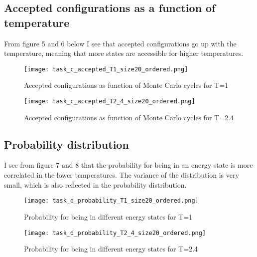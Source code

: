 \subsection{Accepted configurations as a function of temperature}
From figure 5 and 6 below I see that accepted configurations go up with the temperature, meaning that more states are accessible for higher temperatures.


\FloatBarrier
\begin{figure}[!ht]
\centering
\FloatBarrier
\texttt{[image: task\_c\_accepted\_T1\_size20\_ordered.png]}

\caption{Accepted configurations as function of Monte Carlo cycles for T=1}
\label{fig:Earth_orbit_sun_Forward_Euler_k_2}
\end{figure}
\FloatBarrier



\FloatBarrier
\begin{figure}[!ht]
\centering
\FloatBarrier
\texttt{[image: task\_c\_accepted\_T2\_4\_size20\_ordered.png]}

\caption{Accepted configurations as function of Monte Carlo cycles for T=2.4}
\label{fig:Earth_orbit_sun_Forward_Euler_k_2}
\end{figure}
\FloatBarrier


\subsection{Probability distribution}
I see from figure 7 and 8 that the probability for being in an energy state is more correlated in the lower temperatures. The variance of the distribution is very small, which is also reflected in the probability distribution.

\FloatBarrier
\begin{figure}[!ht]
\centering
\FloatBarrier
\texttt{[image: task\_d\_probability\_T1\_size20\_ordered.png]}

\caption{Probability for being in different energy states for T=1}
\label{fig:Earth_orbit_sun_Forward_Euler_k_2}
\end{figure}
\FloatBarrier


\FloatBarrier
\begin{figure}[!ht]
\centering
\FloatBarrier
\texttt{[image: task\_d\_probability\_T2\_4\_size20\_ordered.png]}

\caption{Probability for being in different energy states for T=2.4}
\label{fig:Earth_orbit_sun_Forward_Euler_k_2}
\end{figure}
\FloatBarrier




